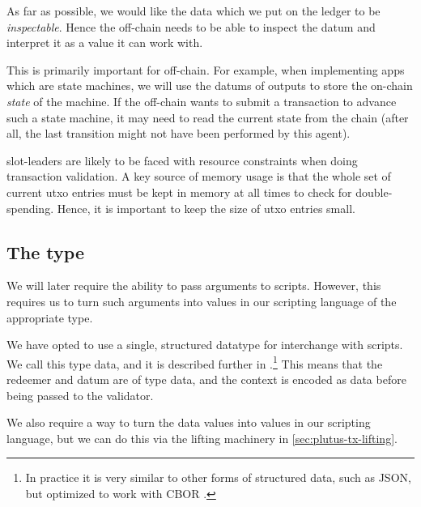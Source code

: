 \begin{requirement}[Inspectability]
\label{req:ledger-inspectability}
As far as possible, we would like the data which we put on the ledger to be \emph{inspectable}.
Hence the \gls{off-chain} needs to be able to inspect the \gls{datum} and interpret it as a value it can work with.

This is primarily important for \gls{off-chain}.
For example, when implementing \glspl{app} which are state machines, we will use the \glspl{datum} of outputs to store the on-chain \emph{state} of the machine.
If the \gls{off-chain} wants to submit a transaction to advance such a state machine, it may need to read the current state from the chain (after all, the last transition might not have been performed by this agent).
\end{requirement}

\begin{requirement}
\label{req:ledger-utxo-size}
\Glspl{slot-leader} are likely to be faced with resource constraints when doing transaction validation.
A key source of memory usage is that the whole set of current \gls{utxo} entries must be kept in memory at all times to check for double-spending.
Hence, it is important to keep the size of \gls{utxo} entries small.
\end{requirement}

\subsection{The  type}
\label{sec:data}

We will later require the ability to pass arguments to \glspl{script}.
However, this requires us to turn such arguments into values in our scripting language of the appropriate type.

We have opted to use a single, structured datatype for interchange with \glspl{script}.
We call this type \gls{data}, and it is described further in \textcite{eutxo}.\footnote{
  In practice it is very similar to other forms of structured data, such as JSON, but optimized to work with CBOR \autocite{cbor}.
}
This means that the \gls{redeemer} and \gls{datum} are of type \gls{data}, and the \gls{context} is encoded as \gls{data} before being passed to the \gls{validator}.

We also require a way to turn the \gls{data} values into values in our scripting language, but we can do this via the lifting machinery in \cref{sec:plutus-tx-lifting}.

